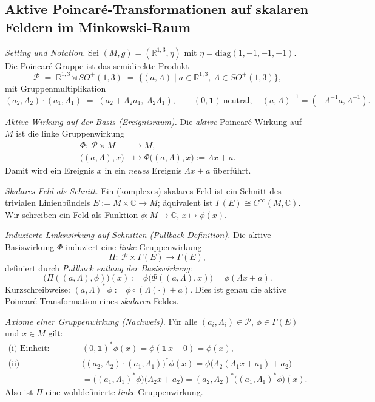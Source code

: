\documentclass[10pt, letterpaper]{article}
\begin{document}
\pagebreak

\subsection{Aktive Poincaré-Transformationen auf skalaren Feldern im Minkowski-Raum}

\emph{Setting und Notation.}
Sei $(M,g)=(\mathbb{R}^{1,3},\eta)$ mit $\eta=\mathrm{diag}(1,-1,-1,-1)$.
Die Poincaré-Gruppe ist das semidirekte Produkt
\[
\mathcal{P}\;=\;\mathbb{R}^{1,3}\rtimes SO^+(1,3)
\;=\;\{(a,\Lambda)\mid a\in\mathbb{R}^{1,3},\ \Lambda\in SO^+(1,3)\},
\]
mit Gruppenmultiplikation
\[
(a_2,\Lambda_2)\cdot(a_1,\Lambda_1)\;=\;(a_2+\Lambda_2 a_1,\ \Lambda_2\Lambda_1),
\qquad (0,\mathbf{1})\ \text{neutral},\quad (a,\Lambda)^{-1}=(-\Lambda^{-1}a,\Lambda^{-1}).
\]

\emph{Aktive Wirkung auf der Basis (Ereignisraum).}
Die \emph{aktive} Poincaré-Wirkung auf $M$ ist die linke Gruppenwirkung
\[
\begin{aligned}
\Phi:\ \mathcal{P}\times M&\longrightarrow M,\\
\bigl((a,\Lambda),x\bigr)&\longmapsto \Phi\bigl((a,\Lambda),x\bigr):=\Lambda x + a.
\end{aligned}
\]
Damit wird ein Ereignis $x$ in ein \emph{neues} Ereignis $\Lambda x+a$ überführt.

\emph{Skalares Feld als Schnitt.}
Ein (komplexes) skalares Feld ist ein Schnitt des trivialen Linienbündels
$E:=M\times\mathbb{C}\to M$; äquivalent ist $\Gamma(E)\cong C^\infty(M,\mathbb{C})$.
Wir schreiben ein Feld als Funktion $\phi:M\to\mathbb{C}$, $x\mapsto \phi(x)$.

\emph{Induzierte Links\-wirkung auf Schnitten (Pullback-Definition).}
Die aktive Basiswirkung $\Phi$ induziert eine \emph{linke} Gruppenwirkung
\[
\Pi:\ \mathcal{P}\times\Gamma(E)\longrightarrow\Gamma(E),
\]
definiert durch \emph{Pullback entlang der Basiswirkung}:
\[
\boxed{\quad
\bigl(\Pi((a,\Lambda),\phi)\bigr)(x)
:= \phi\!\bigl(\Phi((a,\Lambda),x)\bigr)
= \phi(\Lambda x + a).
\quad}
\]
Kurzschreibweise: $(a,\Lambda)^*\,\phi := \phi\circ(\Lambda(\cdot)+a)$.
Dies ist genau die aktive Poincaré-Transformation eines \emph{skalaren} Feldes.

\emph{Axiome einer Gruppenwirkung (Nachweis).}
Für alle $(a_i,\Lambda_i)\in\mathcal{P}$, $\phi\in\Gamma(E)$ und $x\in M$ gilt:
\[
\begin{aligned}
\text{(i) Einheit:}\quad & (0,\mathbf{1})^*\phi(x)=\phi(\mathbf{1}\,x+0)=\phi(x),\\[2pt]
\text{(ii) Verträglichkeit:}\quad &
\bigl((a_2,\Lambda_2)\cdot(a_1,\Lambda_1)\bigr)^*\phi(x)
= \phi\bigl(\Lambda_2(\Lambda_1 x+a_1)+a_2\bigr)\\
&= \bigl((a_1,\Lambda_1)^*\phi\bigr)\bigl(\Lambda_2 x+a_2\bigr)
= (a_2,\Lambda_2)^*\bigl((a_1,\Lambda_1)^*\phi\bigr)(x).
\end{aligned}
\]
Also ist $\Pi$ eine wohldefinierte \emph{linke} Gruppenwirkung.
\end{document}
